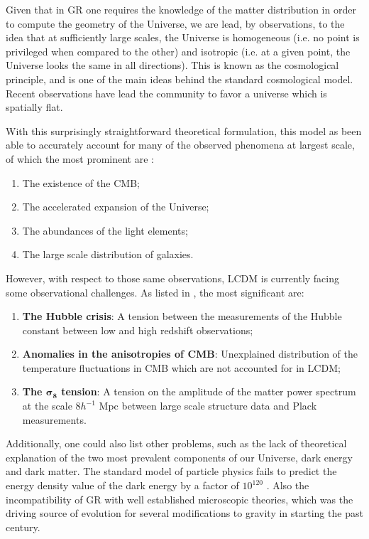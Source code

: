 Given that in \gls{GR} one requires the knowledge of the matter distribution in order to compute the geometry of the Universe, we are lead, by observations, to the idea that at sufficiently large scales, the Universe is homogeneous (i.e. no point is privileged when compared to the other) and isotropic (i.e. at a given point, the Universe looks the same in all directions). This is known as the cosmological principle, and is one of the main ideas behind the standard cosmological model. Recent observations have lead the community to favor a universe which is spatially flat.

With this surprisingly straightforward theoretical formulation, this model as been able to accurately account for many of the observed phenomena at largest scale, of which the most prominent are \cite{Amendola2010}:

\begin{enumerate}
    \item The existence of the \gls{CMB};
    \item The accelerated expansion of the Universe;
    \item The abundances of the light elements;
    \item The large scale distribution of galaxies.
\end{enumerate}

However, with respect to those same observations, \gls{LCDM} is currently facing some observational challenges. As listed in \cite{LCDM-R2021}, the most significant are:

\begin{enumerate}[font=\bfseries]
    \item \textbf{The Hubble crisis}: A tension between the measurements of the Hubble constant between low and high redshift observations;
    \item \textbf{Anomalies in the anisotropies of \gls{CMB}}: Unexplained distribution of the temperature fluctuations in \gls{CMB} which are not accounted for in \gls{LCDM};
    \item \textbf{The $\boldsymbol{\sigma}_{\boldsymbol{8}}$ tension}: A tension on the amplitude of the matter power spectrum at the scale $8 h^{−1}$ Mpc between large scale structure data and Plack measurements.
\end{enumerate}

\noindent Additionally, one could also list other problems, such as the lack of theoretical explanation of the two most prevalent components of our Universe, dark energy and dark matter. The standard model of particle physics fails to predict the energy density value of the dark energy by a factor of $10^{120}$ \cite{Carroll2001}. Also the incompatibility of \gls{GR} with well established microscopic theories, which was the driving source of evolution for several modifications to gravity in starting the past century.


